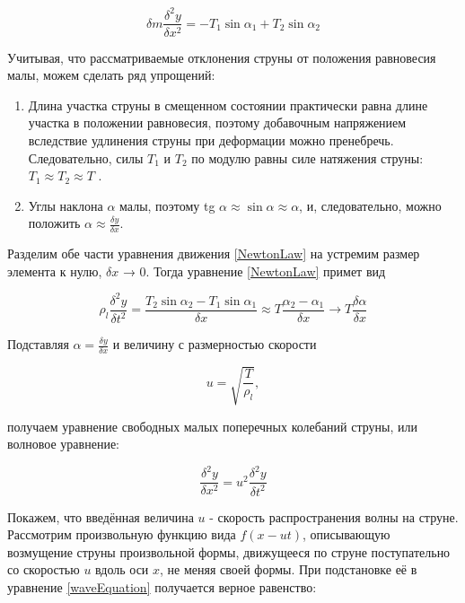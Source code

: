 \documentclass[a4paper,12pt]{article} %
\begin{document}
\begin{equation}
    \delta m \frac{\delta^2 y}{\delta x^2} = -T_1 \sin{\alpha_1} + T_2 \sin{\alpha_2}
    \label{NewtonLaw}
\end{equation}

Учитывая, что рассматриваемые отклонения струны от положения
равновесия малы, можем сделать ряд упрощений:
\begin{enumerate}
    \item Длина участка струны в смещенном состоянии практически равна
длине участка в положении равновесия, поэтому добавочным
напряжением вследствие удлинения струны при деформации можно пренебречь. Следовательно, силы $ T_1 $ и $ T_2 $ по модулю равны силе
натяжения струны: $ T_1 \approx T_2 \approx T $ .
\item Углы наклона $ \alpha $ малы, поэтому tg $ \alpha \approx \sin \alpha \approx \alpha $, и, следовательно,
можно положить $ \alpha \approx \frac{\delta y}{\delta x}$.
\end{enumerate}

Разделим обе части уравнения движения \eqref{NewtonLaw} на  устремим размер элемента к нулю, $ \delta x $ → 0. Тогда уравнение \eqref{NewtonLaw} примет вид

\begin{equation}
    \rho_l \frac{\delta^2 y}{\delta t^2} = \frac{T_2 \sin{\alpha_2} - T_1 \sin{\alpha_1}}{\delta x} \approx T \frac{\alpha_2 - \alpha_1}{\delta x} \longrightarrow T \frac{\delta \alpha}{\delta x}
\end{equation}

Подставляя $ \alpha = \frac{\delta y}{\delta x}$ и величину с размерностью скорости

\begin{equation}
    u = \sqrt{\frac{T}{\rho_l}},
    \label{sped}
\end{equation}

получаем уравнение свободных малых поперечных колебаний
струны, или волновое уравнение:

\begin{equation}
    \frac{\delta^2 y}{\delta x^2} = u^2 \frac{\delta^2 y}{\delta t^2}
    \label{waveEquation}
\end{equation}

Покажем, что введённая величина $ u $ - скорость распространения волны на струне. Рассмотрим произвольную функцию вида $ f(x - ut) $, описывающую возмущение струны произвольной формы, движущееся по струне поступательно со скоростью $ u $ вдоль оси $ x $, не меняя своей формы. При подстановке её в уравнение \eqref{waveEquation} получается верное равенство:
\end{document}
